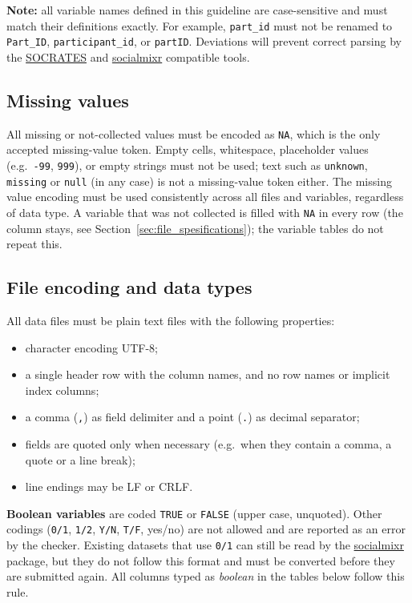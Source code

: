 \documentclass[11pt,a4paper]{article}
\begin{document}
\noindent \textbf{Note:} all variable names defined in this guideline are case-sensitive and must match their definitions exactly. For example, \texttt{part\_id} must not be renamed to \texttt{Part\_ID}, \texttt{participant\_id}, or \texttt{partID}. Deviations will prevent correct parsing by the \href{https://lwillem.shinyapps.io/socrates_rshiny/}{SOCRATES} and \href{https://cran.r-project.org/web/packages/socialmixr/vignettes/socialmixr.html}{socialmixr} compatible tools.

\subsection{Missing values}
\label{sec:missing}
All missing or not-collected values must be encoded as \texttt{NA}, which is the only accepted missing-value token. Empty cells, whitespace, placeholder values (e.g.\ \texttt{-99}, \texttt{999}), or empty strings must not be used; text such as \texttt{unknown}, \texttt{missing} or \texttt{null} (in any case) is not a missing-value token either. The missing value encoding must be used consistently across all files and variables, regardless of data type. A variable that was not collected is filled with \texttt{NA} in every row (the column stays, see Section~\ref{sec:file_spesifications}); the variable tables do not repeat this.

\subsection{File encoding and data types}
\label{sec:encoding}
All data files must be plain text files with the following properties:
\begin{itemize}
    \item character encoding UTF-8;
    \item a single header row with the column names, and no row names or implicit index columns;
    \item a comma (\texttt{,}) as field delimiter and a point (\texttt{.}) as decimal separator;
    \item fields are quoted only when necessary (e.g.\ when they contain a comma, a quote or a line break);
    \item line endings may be LF or CRLF.
\end{itemize}
\noindent \textbf{Boolean variables} are coded \texttt{TRUE} or \texttt{FALSE} (upper case, unquoted). Other codings (\texttt{0/1}, \texttt{1/2}, \texttt{Y/N}, \texttt{T/F}, yes/no) are not allowed and are reported as an error by the checker. Existing datasets that use \texttt{0/1} can still be read by the \href{https://cran.r-project.org/web/packages/socialmixr/index.html}{socialmixr} package, but they do not follow this format and must be converted before they are submitted again.
All columns typed as \emph{boolean} in the tables below follow this rule.
\end{document}
